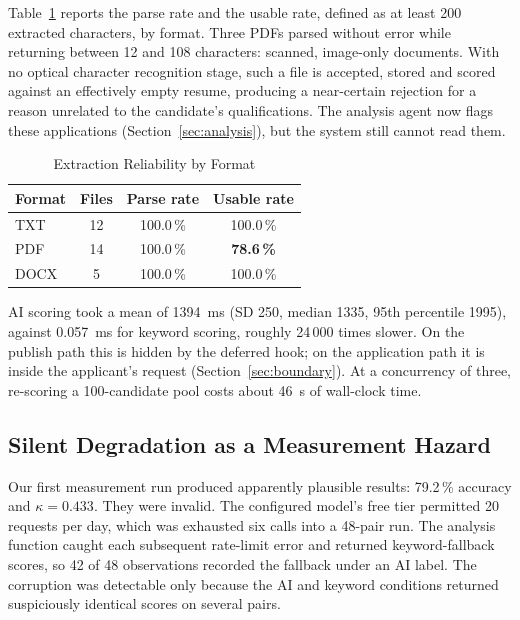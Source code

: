 \documentclass[conference]{IEEEtran}
\begin{document}
Table~\ref{tab:extraction} reports the parse rate and the usable rate, defined
as at least 200 extracted characters, by format. Three PDFs parsed without error
while returning between 12 and 108 characters: scanned, image-only documents.
With no optical character recognition stage, such a file is accepted, stored and
scored against an effectively empty resume, producing a near-certain rejection
for a reason unrelated to the candidate's qualifications. The analysis agent now
flags these applications (Section~\ref{sec:analysis}), but the system still
cannot read them.

\begin{table}[!t]
\caption{Extraction Reliability by Format}
\label{tab:extraction}
\begin{center}
\begin{tabular}{|l|c|c|c|}
\hline
\textbf{Format} & \textbf{Files} & \textbf{Parse rate} & \textbf{Usable rate} \\
\hline
TXT & 12 & 100.0\,\% & 100.0\,\% \\
\hline
PDF & 14 & 100.0\,\% & \textbf{78.6\,\%} \\
\hline
DOCX & 5 & 100.0\,\% & 100.0\,\% \\
\hline
\end{tabular}
\end{center}
\end{table}

AI scoring took a mean of 1394~ms (SD 250, median 1335, 95th percentile 1995),
against 0.057~ms for keyword scoring, roughly 24\,000 times slower. On the
publish path this is hidden by the deferred hook; on the application path it is
inside the applicant's request (Section~\ref{sec:boundary}). At a concurrency of
three, re-scoring a 100-candidate pool costs about 46~s of wall-clock time.

\subsection{Silent Degradation as a Measurement Hazard}
\label{sec:silent}

Our first measurement run produced apparently plausible results: 79.2\,\%
accuracy and $\kappa = 0.433$. They were invalid. The configured model's free
tier permitted 20 requests per day, which was exhausted six calls into a 48-pair
run. The analysis function caught each subsequent rate-limit error and returned
keyword-fallback scores, so 42 of 48 observations recorded the fallback under an
AI label. The corruption was detectable only because the AI and keyword
conditions returned suspiciously identical scores on several pairs.
\end{document}

